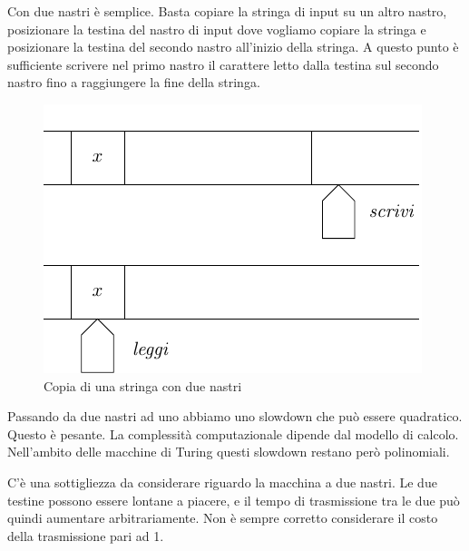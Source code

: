 Con due nastri è semplice. Basta copiare la stringa di input su un altro nastro, posizionare la
testina del nastro di input dove vogliamo copiare la stringa e posizionare la testina del secondo
nastro all'inizio della stringa. A questo punto è sufficiente scrivere nel primo nastro il
carattere letto dalla testina sul secondo nastro fino a raggiungere la fine della stringa.

\begin{figure}[h]
    \begin{center}
        \includegraphics{./img/deterministic_complexity_classes/CopyString2Tapes.pdf}
        \caption{Copia di una stringa con due nastri}
    \end{center}
\end{figure}

Passando da due nastri ad uno abbiamo uno slowdown che può essere quadratico. Questo è pesante. La
complessità computazionale dipende dal modello di calcolo. Nell'ambito delle macchine di Turing
questi slowdown restano però polinomiali.

C'è una sottigliezza da considerare riguardo la macchina a due nastri. Le due testine possono
essere lontane a piacere, e il tempo di trasmissione tra le due può quindi aumentare
arbitrariamente. Non è sempre corretto considerare il costo della trasmissione pari ad 1.





